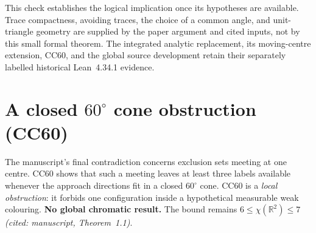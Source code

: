 \documentclass[11pt]{article}
\theoremstyle{definition}
\theoremstyle{remark}
\begin{document}
This check establishes the logical implication once its hypotheses are
available. Trace compactness, avoiding traces, the choice of a common angle,
and unit-triangle geometry are supplied by the paper argument and cited
inputs, not by this small formal theorem. The integrated analytic replacement,
its moving-centre extension, CC60, and the global source development retain
their separately labelled historical Lean~4.34.1 evidence.

%

\section{A closed $60^\circ$ cone obstruction (CC60)}
\label{sec:cc60}

The manuscript's final contradiction concerns exclusion sets meeting at one
centre. CC60 shows that such a meeting leaves at least three labels
available whenever the approach directions fit in a closed $60^\circ$
cone. CC60 is a \emph{local obstruction}: it
forbids one configuration inside a hypothetical measurable weak colouring.
\textbf{No global chromatic result.} The bound remains
$6\le\chi(\mathbb R^2)\le7$ \emph{(cited: manuscript, Theorem~1.1)}.
\end{document}
